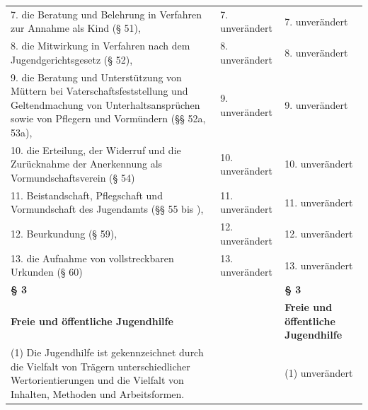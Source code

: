 \documentclass[10pt,a4paper,landscape]{article}
\begin{document}
\begin{longtable}{|L{8.2cm}|L{8.2cm}|L{8.2cm}|}
\hhline{|---|}
7.  \newline die Beratung und Belehrung in Verfahren  \newline zur Annahme als Kind (\S{} 51), & 7. unverändert & 7. unverändert \\
\hhline{|---|}
8.  \newline die Mitwirkung in Verfahren nach dem  \newline Jugendgerichtsgesetz (\S{} 52), & 8. unverändert & 8. unverändert \\
\hhline{|---|}
9.  \newline die Beratung und Unterstützung von  \newline Müttern bei Vaterschaftsfeststellung und  \newline Geltendmachung von  \newline Unterhaltsansprüchen sowie von Pflegern  \newline und Vormündern (\S{}\S{} 52a, 53a), & 9. unverändert & 9. unverändert \\
\hhline{|---|}
10.  \newline die Erteilung, der Widerruf und die  \newline Zurücknahme der Anerkennung als  \newline Vormundschaftsverein (\S{} 54) & 10. unverändert & 10. unverändert \\
\hhline{|---|}
11.  \newline Beistandschaft, Pflegschaft und  \newline Vormundschaft des Jugendamts (\S{}\S{} 55 bis  ), & 11. unverändert & 11. unverändert \\
\hhline{|---|}
12.  \newline Beurkundung (\S{} 59), & 12. unverändert & 12. unverändert \\
\hhline{|---|}
13.  \newline die Aufnahme von vollstreckbaren  \newline Urkunden (\S{} 60) & 13. unverändert & 13. unverändert \\
\hhline{|---|}
\textbf{\S{} 3} &  & \textbf{\S{} 3} \\
\hhline{|---|}
\textbf{Freie und öffentliche Jugendhilfe} &  & \textbf{Freie und öffentliche Jugendhilfe} \\
\hhline{|---|}
(1) Die Jugendhilfe ist gekennzeichnet  \newline durch die Vielfalt von Trägern  \newline unterschiedlicher Wertorientierungen und  \newline die Vielfalt von Inhalten, Methoden und  \newline Arbeitsformen. &  & (1) unverändert \\

\end{longtable}
\end{document}
